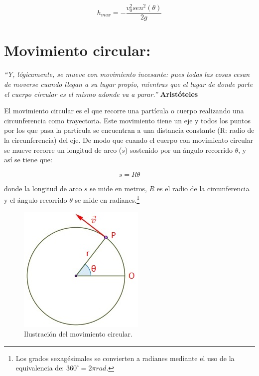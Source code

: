 \documentclass[a5paper,pagesize,10pt,bibtotoc,pointlessnumbers,
normalheadings,DIV=9,fleqn,x11names,table,twoside=false]{scrbook}
\begin{document}
\begin{equation}
 h_{max} = -\frac{v_0^2sen^2(\theta)}{2g}
\end{equation}

\chapter{Movimiento circular:}

\textit{``Y, lógicamente, se mueve con movimiento incesante: pues todas las cosas cesan de moverse cuando llegan a su lugar 
propio, mientras que el lugar de donde parte el cuerpo circular es el mismo adonde va a parar.''} \textbf{Aristóteles}
\vspace{1.0cm}

El movimiento circular es el que recorre una partícula o cuerpo realizando una circunferencia como trayectoria. Este movimiento 
tiene un eje y todos los puntos por los que pasa la partícula se encuentran a una distancia constante (R: radio de la 
circunferencia) del eje. De modo que cuando el cuerpo con movimiento circular se mueve recorre un longitud de arco ($s$) 
sostenido por un ángulo recorrido $\theta$, y así se tiene que:

\begin{equation}
 s = R\theta
\end{equation}

donde la longitud de arco $s$ se mide en metros, $R$ es el radio de la circunferencia y el ángulo recorrido $\theta$ se mide en 
radianes.\footnote{Los grados sexagésimales se convierten a radianes mediante el uso de la equivalencia de: $360^\circ = 2\pi 
rad$.}

\begin{figure}[ht]
 \centering
 \includegraphics[scale=0.6]{images/movimiento-circular.jpg}
 \caption{Ilustración del movimiento circular.}\label{circular}
\end{figure}   
\end{document}
